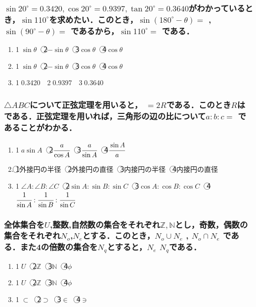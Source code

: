 \documentclass[onecolumn,10pt]{jarticle}
\newcommand{\ctext}[1]{\textcircled{\scriptsize #1}}
\begin{document}
\subsubsection{$\sin20^\circ=0.3420, \cos20^\circ=0.9397, \tan20^\circ=0.3640$がわかっているとき，$\sin110^\circ$を求めたい．このとき，$\sin(180^\circ-\theta)=$  , $\sin(90^\circ-\theta)=$  であるから，$\sin110^\circ=$  である．}
\begin{enumerate}[(1)]
    \item \ctext{1}$\sin\theta$　\ctext{2}$-\sin\theta$　\ctext{3}$\cos\theta$　\ctext{4}$\cos\theta$
    \item \ctext{1}$\sin\theta$　\ctext{2}$-\sin\theta$　\ctext{3}$\cos\theta$　\ctext{4}$\cos\theta$
    \item \ctext{1}0.3420　\ctext{2}0.9397　\ctext{3}0.3640
\end{enumerate}

\subsubsection{$\triangle{ABC}$について正弦定理を用いると，  $=2R$である．このとき$R$は  である．正弦定理を用いれば，三角形の辺の比について$a:b:c=$  であることがわかる．}
\begin{enumerate}[(1)]
    \item \ctext{1}$a\sin A$　\ctext{2}$\cfrac{a}{\cos A}$　\ctext{3}$\cfrac{a}{\sin A}$　\ctext{4}$\cfrac{\sin A}{a}$
    \item \ctext{1}外接円の半径　\ctext{2}外接円の直径　\ctext{3}内接円の半径　\ctext{4}内接円の直径
    \item \ctext{1}$\angle A:\angle B:\angle C$　\ctext{2}$\sin A:\sin B:\sin C$　\ctext{3}$\cos A:\cos B: \cos C$　\ctext{4}$\cfrac{1}{\sin A}:\cfrac{1}{\sin B}:\cfrac{1}{\sin C}$
\end{enumerate}

\newpage

\subsubsection{全体集合を$U$,整数,自然数の集合をそれぞれ$\mathbb{Z}, \mathbb{N}$とし，奇数，偶数の集合をそれぞれ$N_o$,$N_e$とする．このとき，$N_o \cup N_e$  , $N_o \cap N_e$  である．また4の倍数の集合を$N_q$とすると，$N_e$  $N_q$である．}
\begin{enumerate}[(1)]
    \item \ctext{1}$U$　\ctext{2}$\mathbb{Z}$　\ctext{3}$\mathbb{N}$　\ctext{4}$\phi$
    \item \ctext{1}$U$　\ctext{2}$\mathbb{Z}$　\ctext{3}$\mathbb{N}$　\ctext{4}$\phi$
    \item \ctext{1}$\subset$　\ctext{2}$\supset$　\ctext{3}$\in$　\ctext{4}$\ni$
\end{enumerate}
\end{document}
